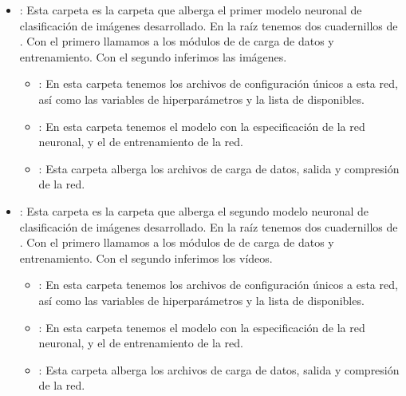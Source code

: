 \begin{itemize}
\begin{itemize}
\begin{itemize}
                  \item {}: Esta carpeta es la carpeta que alberga el primer modelo neuronal de clasificación de imágenes desarrollado. En la raíz tenemos dos cuadernillos de . Con el primero llamamos a los módulos de  de carga de datos y entrenamiento. Con el segundo inferimos las imágenes.
                        \begin{itemize}
                          \item {}: En esta carpeta tenemos los archivos de configuración únicos a esta red, así como las variables de hiperparámetros y la lista de  disponibles.
                          \item {}: En esta carpeta tenemos el modelo con la especificación de la red neuronal, y el  de entrenamiento de la red.
                          \item {}: Esta carpeta alberga los archivos de carga de datos, salida y compresión de la red.
                        \end{itemize}

                  \item {}: Esta carpeta es la carpeta que alberga el segundo modelo neuronal de clasificación de imágenes desarrollado. En la raíz tenemos dos cuadernillos de . Con el primero llamamos a los módulos de  de carga de datos y entrenamiento. Con el segundo inferimos los vídeos.
                        \begin{itemize}
                          \item {}: En esta carpeta tenemos los archivos de configuración únicos a esta red, así como las variables de hiperparámetros y la lista de  disponibles.
                          \item {}: En esta carpeta tenemos el modelo con la especificación de la red neuronal, y el  de entrenamiento de la red.
                          \item {}: Esta carpeta alberga los archivos de carga de datos, salida y compresión de la red.
                        \end{itemize}


\end{itemize}
\end{itemize}
\end{itemize}
